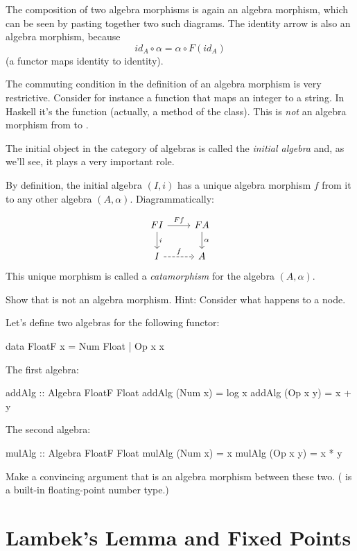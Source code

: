 \documentclass[DaoFP]{subfiles}
\begin{document}
The composition of two algebra morphisms is again an algebra morphism, which can be seen by pasting together two such diagrams. The identity arrow is also an algebra morphism, because 
\[ id_A \circ \alpha = \alpha \circ F (id_A) \]
(a functor maps identity to identity).

The commuting condition in the definition of an algebra morphism is very restrictive. Consider for instance a function that maps an integer to a string. In Haskell it's the  function (actually, a method of the  class). This is \emph{not} an algebra morphism from  to . 

The initial object in the category of algebras is called the \emph{initial algebra} and, as we'll see, it plays a very important role.

By definition, the initial algebra $(I, i)$ has a unique algebra morphism $f$ from it to any other algebra $(A, \alpha)$. Diagrammatically:

\[
 \begin{tikzcd}
 F I 
 \arrow[r, "F f"]
 \arrow[d, "i"]
 & F A
\arrow[d, "\alpha"]
 \\
 I
 \arrow[r, dashed, "f"]
 & A
  \end{tikzcd}
\]
 This unique morphism is called a \emph{catamorphism} for the algebra $(A, \alpha)$.

\begin{exercise}
Show that  is not an algebra morphism. Hint: Consider what happens to a  node.
\end{exercise}

\begin{exercise}
Let's define two algebras for the following functor:
\begin{haskell}
data FloatF x = Num Float | Op x x
\end{haskell}
The first algebra:
\begin{haskell}
addAlg :: Algebra FloatF Float
addAlg (Num x) = log x
addAlg (Op x y) = x + y
\end{haskell}
The second algebra:
\begin{haskell}
mulAlg :: Algebra FloatF Float
mulAlg (Num x) = x
mulAlg (Op x y) = x * y
\end{haskell}
Make a convincing argument that  is an algebra morphism between these two. ( is a built-in floating-point number type.)
\end{exercise}

\section{Lambek's Lemma and Fixed Points}
\end{document}
